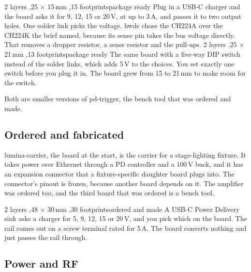 \boardpair
{%
{2 layers \sep 25 $\times$ 15\,mm \sep 15 footprints}{package ready}%
{Plug in a USB-C charger and the board asks it for 9, 12, 15 or 20\,V, at up to
3\,A, and passes it to two output holes. One solder link picks the voltage.
hwde chose the CH224A over the CH224K the brief named, because its sense pin
takes the bus voltage directly. That removes a dropper resistor, a sense
resistor and the pull-ups.}}
{%
{2 layers \sep 25 $\times$ 21\,mm \sep 13 footprints}{package ready}%
{The same board with a five-way DIP switch instead of the solder links, which
adds 5\,V to the choices. You set exactly one switch before you plug it in.
The board grew from 15 to 21\,mm to make room for the switch.}}

Both are smaller versions of pd-trigger, the bench tool that was ordered and
made.

\newpage

\subsection{Ordered and fabricated}

lumina-carrier, the board at the start, is the carrier for a stage-lighting
fixture. It takes power over Ethernet through a PD controller and a 100\,V
buck, and it has an expansion connector that a fixture-specific daughter board
plugs into. The connector's pinout is frozen, because another board depends on
it. The amplifier was ordered too, and the third board that was ordered is a
bench tool.

%
{2 layers \sep 48 $\times$ 30\,mm \sep 30 footprints}{ordered and made}%
{A USB-C Power Delivery sink asks a charger for 5, 9, 12, 15 or 20\,V, and you
pick which on the board. The rail comes out on a screw terminal rated for
5\,A. The board converts nothing and just passes the rail through.}

\newpage

\subsection{Power and RF}

